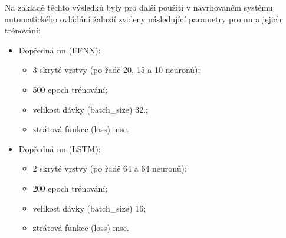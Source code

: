     Na základě těchto výsledků byly pro další použití v navrhovaném systému automatického ovládání žaluzií zvoleny následující parametry pro \acrshort{nn} a jejich trénování:
    \begin{itemize}
        \item Dopředná \acrshort{nn} (FFNN):
        \begin{itemize}
            \item 3 skryté vrstvy (po řadě 20, 15 a 10 neuronů);
            \item 500 epoch trénování;
            \item velikost dávky (batch\_size) 32.;
            \item ztrátová funkce (loss) \acrshort{mse}.
        \end{itemize}
        \item Dopředná \acrshort{nn} (LSTM):
        \begin{itemize}
            \item 2 skryté vrstvy (po řadě 64 a 64 neuronů);
            \item 200 epoch trénování;
            \item velikost dávky (batch\_size) 16;
            \item ztrátová funkce (loss) \acrshort{mse}.
        \end{itemize}
    \end{itemize}
